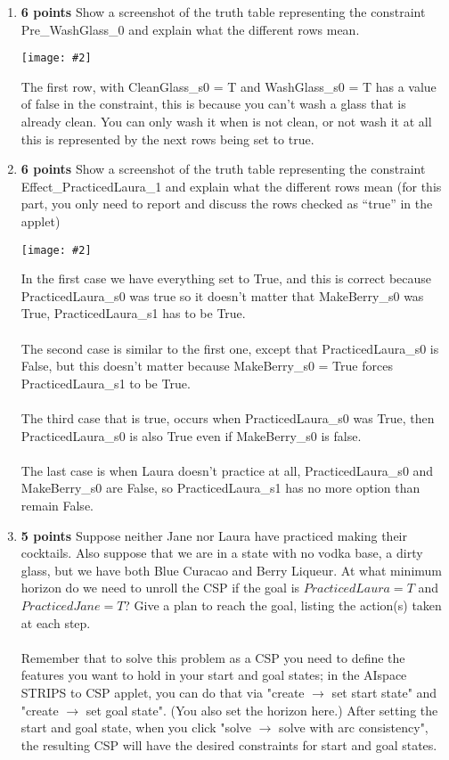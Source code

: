 \documentclass{article}
\def\ans#1{{\color{ans}#1}}
\newcommand{\centerfig}[2]{\begin{center}\texttt{[image: \#2]}\end{center}}
\begin{document}
\begin{enumerate}[label=(\alph*)]
    \centerfig{1}{../figs/q2_1.png}
    \item \textbf{6 points} Show a screenshot of the truth table representing the constraint Pre\_WashGlass\_0 and explain what the different rows mean. \\
    \centerfig{0.6}{../figs/q2_2.png}
    \ans{
        The first row, with CleanGlass\_s0 = T and WashGlass\_s0 = T has a value of false in the 
        constraint, this is because you can't wash a glass that is already clean. You can only wash it 
        when is not clean, or not wash it at all this is represented by the next rows being set to true.
    }
    \item \textbf{6 points} Show a screenshot of the truth table representing the constraint Effect\_PracticedLaura\_1 and explain what the different rows mean (for this part, you only need to report and discuss the rows checked as “true” in the applet)\\
    \centerfig{0.6}{../figs/q2_3.png}
    \ans{
        In the first case we have everything set to True, and this is correct because PracticedLaura\_s0 
        was true so it doesn't matter that MakeBerry\_s0 was True, PracticedLaura\_s1 has to be True. \\ \\
        The second case is similar to the first one, except that PracticedLaura\_s0 is False, but this 
        doesn't matter because MakeBerry\_s0 = True forces PracticedLaura\_s1 to be True. \\ \\
        The third case that is true, occurs when PracticedLaura\_s0 was True, then PracticedLaura\_s0 is 
        also True even if MakeBerry\_s0 is false. \\ \\
        The last case is when Laura doesn't practice at all, PracticedLaura\_s0 and MakeBerry\_s0 are 
        False, so PracticedLaura\_s1 has no more option than remain False.
    }
    \item \textbf{5 points} Suppose neither Jane nor Laura have practiced making their cocktails. Also suppose that we are in a state with no vodka base, a dirty glass, but we have both Blue Curacao and Berry Liqueur. At what minimum horizon do we need to unroll the CSP if the goal is $PracticedLaura = T$ and $PracticedJane = T$? Give a plan to reach the goal, listing the action(s) taken at each step. \\ \\ Remember that to solve this problem as a CSP you need to define the features you want to hold in your start and goal states; in the AIspace STRIPS to CSP applet, you can do that via "create $\rightarrow$ set start state" and "create $\rightarrow$ set goal state". (You also set the horizon here.) After setting the start and goal state, when you click "solve $\rightarrow$ solve with arc consistency", the resulting CSP will have the desired constraints for start and goal states.\\

\end{enumerate}
\end{document}
